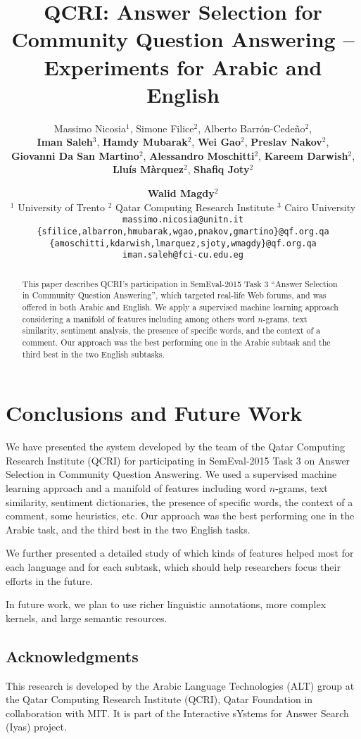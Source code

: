 \documentclass[11pt,letterpaper]{article}
\title{%
QCRI: Answer Selection for Community Question Answering --\\
Experiments for Arabic and English
}
\author{%
Massimo Nicosia$^1$, Simone Filice$^2$, Alberto Barr\'on-Cede\~no$^2$,  \\
{\bf Iman Saleh}$^3$, {\bf Hamdy Mubarak}$^2$, {\bf Wei Gao$^2$}, 
{\bf Preslav Nakov$^2$}, \\
{\bf Giovanni Da San Martino$^2$}, {\bf Alessandro Moschitti}$^2$,
{\bf Kareem Darwish$^2$}, \\ 
{\bf Llu\'is M\`arquez$^2$}, {\bf Shafiq Joty$^2$} \and {\bf Walid Magdy$^2$} 
\\
$^1$ University of Trento \hspace{1em}
$^2$ Qatar Computing Research Institute	\hspace{1em}
$^3$ Cairo University \\
\small
{\tt massimo.nicosia@unitn.it}	\\
\small
{\tt \{sfilice,albarron,hmubarak,wgao,pnakov,gmartino\}@qf.org.qa} 	\\
\small
{\tt \{amoschitti,kdarwish,lmarquez,sjoty,wmagdy\}@qf.org.qa}	\\
\small
{\tt iman.saleh@fci-cu.edu.eg}
% 
% 
% 
% 
% 
}
\date{}
\begin{document}
\maketitle
\begin{abstract}
This paper describes QCRI's participation in SemEval-2015 Task 3 ``Answer 
Selection in Community Question Answering'',
which targeted real-life Web forums,
and was offered in both Arabic and English.
We apply a supervised machine learning approach 
considering a manifold of features including among others word $n$-grams, text 
similarity, sentiment analysis, the presence of specific words, and the context 
of a comment.
Our approach was the best performing one in the Arabic subtask and the third 
best in the two English subtasks.
\end{abstract}


% 





\section{Conclusions and Future Work}
\label{sec:conclusion}

We have presented the system developed by the team of the Qatar Computing Research Institute (QCRI)
for participating in SemEval-2015 Task 3 on Answer Selection in Community Question Answering.
We used a supervised machine learning approach and a manifold of features including word
$n$-grams, text similarity, sentiment dictionaries, the presence of specific words, the context of a comment, some heuristics, etc.
Our approach was the best performing one in the Arabic task,
and the third best in the two English tasks.

We further presented a detailed study of which kinds of features helped most for each language and for each subtask, which should help researchers focus their efforts in the future.

In future work, we plan to use richer linguistic annotations, more complex kernels,
and large semantic resources.%


\begin{footnotesize}
\section*{Acknowledgments}
This research is developed by the Arabic Language Technologies (ALT) group at the Qatar Computing Research Institute (QCRI), Qatar Foundation in collaboration with MIT. It is part of the Interactive sYstems for Answer Search (Iyas) project.
\end{footnotesize}
\end{document}
